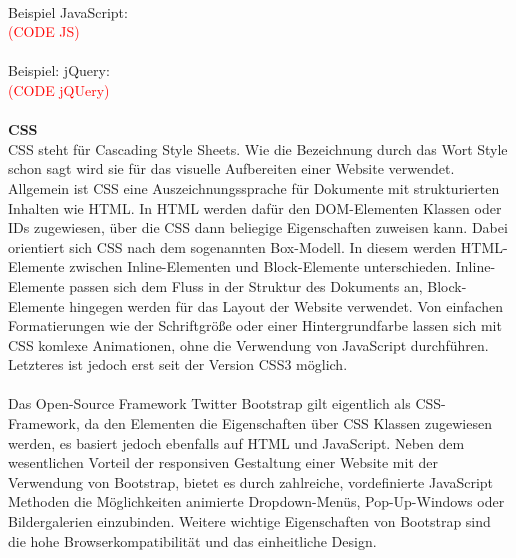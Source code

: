     \\
    Beispiel JavaScript:\\
    \textcolor{red}{(CODE JS)}\\
    \\
    Beispiel: jQuery:\\
    \textcolor{red}{(CODE jQUery)}\\
    \\
    \textbf{CSS}\\
    {CSS\cite{css}} steht für Cascading Style Sheets. Wie die Bezeichnung durch das Wort Style schon sagt wird sie für das visuelle Aufbereiten einer Website verwendet.
    Allgemein ist CSS eine Auszeichnungssprache für Dokumente mit strukturierten Inhalten wie HTML. In HTML werden dafür den DOM-Elementen Klassen oder IDs
    zugewiesen, über die CSS dann beliegige Eigenschaften zuweisen kann. Dabei orientiert sich CSS nach dem sogenannten Box-Modell. In diesem werden HTML-Elemente
    zwischen Inline-Elementen und Block-Elemente unterschieden. Inline-Elemente passen sich dem Fluss in der Struktur des Dokuments an, Block-Elemente hingegen
    werden für das Layout der Website verwendet. Von einfachen Formatierungen wie der Schriftgröße oder einer Hintergrundfarbe lassen sich mit CSS komlexe Animationen,
    ohne die Verwendung von JavaScript durchführen. Letzteres ist jedoch erst seit der Version CSS3 möglich.\\
    \\
    Das Open-Source Framework {Twitter Bootstrap\cite{bootstrap}} gilt eigentlich als CSS-Framework, da den Elementen die Eigenschaften über CSS Klassen zugewiesen werden, es basiert jedoch
    ebenfalls auf HTML und JavaScript. Neben dem wesentlichen Vorteil der responsiven Gestaltung einer Website mit der Verwendung von Bootstrap, bietet es durch
    zahlreiche, vordefinierte JavaScript Methoden die Möglichkeiten animierte Dropdown-Menüs, Pop-Up-Windows oder Bildergalerien einzubinden.
    Weitere wichtige Eigenschaften von Bootstrap sind die hohe Browserkompatibilität und das einheitliche Design.\\
    \\
